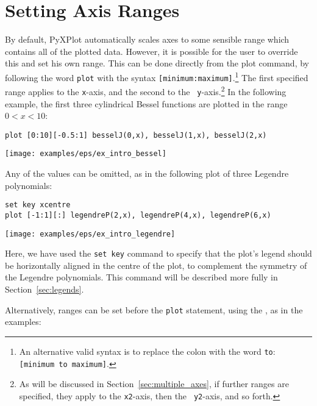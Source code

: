 
\section{Setting Axis Ranges}
\label{sec:plot_ranges}

By default, PyXPlot automatically scales axes to some sensible range which
contains all of the plotted data. However, it is possible for the user to
override this and set his own range. This can be
done directly from the plot command, by following the word {\tt plot} with the
syntax {\tt [minimum:maximum]}.\footnote{An alternative valid syntax is to
replace the colon with the word {\tt to}: {\tt [minimum to maximum]}.} The
first specified range applies to the {\tt x}-axis, and the second to the {\tt
y}-axis.\footnote{As will be discussed in Section~\ref{sec:multiple_axes}, if
further ranges are specified, they apply to the {\tt x2}-axis, then the {\tt
y2}-axis, and so forth.} In the following example, the first three cylindrical
Bessel functions are plotted in the range $0<x<10$:

\begin{verbatim}
plot [0:10][-0.5:1] besselJ(0,x), besselJ(1,x), besselJ(2,x)
\end{verbatim}
\begin{center}
\texttt{[image: examples/eps/ex\_intro\_bessel]}
\end{center}

\noindent Any of the values can be omitted, as in the following plot of
three Legendre polynomials:

\begin{verbatim}
set key xcentre
plot [-1:1][:] legendreP(2,x), legendreP(4,x), legendreP(6,x)
\end{verbatim}
\begin{center}
\texttt{[image: examples/eps/ex\_intro\_legendre]}
\end{center}

\noindent Here, we have used the {\tt set key} command to specify that the
plot's legend should be horizontally aligned in the centre of the plot, to
complement the symmetry of the Legendre polynomials. This command will be
described more fully in Section~\ref{sec:legends}.

Alternatively, ranges can be set before the {\tt plot} statement, using the
, as in the examples:

